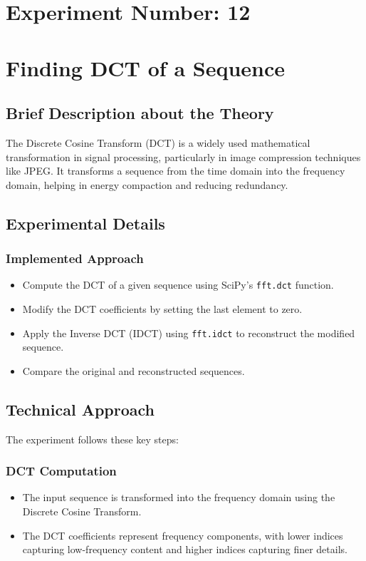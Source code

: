 \documentclass[12pt,a4paper]{article}
\begin{document}
\newpage
\section*{Experiment Number: 12}
\section{Finding DCT of a Sequence}

\subsection{Brief Description about the Theory}
The Discrete Cosine Transform (DCT) is a widely used mathematical transformation in signal processing, particularly in image compression techniques like JPEG. It transforms a sequence from the time domain into the frequency domain, helping in energy compaction and reducing redundancy.

\subsection{Experimental Details}
\subsubsection{Implemented Approach}
\begin{itemize}
  \item Compute the DCT of a given sequence using SciPy's \texttt{fft.dct} function.
  \item Modify the DCT coefficients by setting the last element to zero.
  \item Apply the Inverse DCT (IDCT) using \texttt{fft.idct} to reconstruct the modified sequence.
  \item Compare the original and reconstructed sequences.
\end{itemize}

\subsection{Technical Approach}
The experiment follows these key steps:

\subsubsection{DCT Computation}
\begin{itemize}
  \item The input sequence is transformed into the frequency domain using the Discrete Cosine Transform.
  \item The DCT coefficients represent frequency components, with lower indices capturing low-frequency content and higher indices capturing finer details.
\end{itemize}
\end{document}
